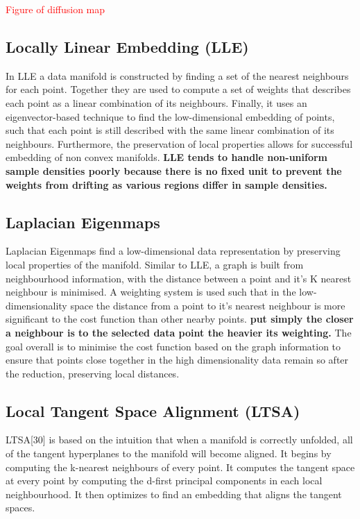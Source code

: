 \textcolor{red}{Figure of diffusion map}


\subsection{Locally Linear Embedding (LLE)}
In LLE a data manifold is constructed by finding a set of the nearest neighbours for each point. Together they are used to compute a set of weights that describes each point as a linear combination of its neighbours.
Finally, it uses an eigenvector-based technique to find the low-dimensional embedding of points, such that each point is still described with the same linear combination of its neighbours. Furthermore, the preservation of local properties allows for successful embedding of non convex manifolds.
{\bf LLE tends to handle non-uniform sample densities poorly because there is no fixed unit to prevent the weights from drifting as various regions differ in sample densities.}




\subsection{Laplacian Eigenmaps}\cite{Belkin2003}
Laplacian Eigenmaps find a low-dimensional data representation by preserving local properties of the
manifold. Similar to LLE, a graph is built from neighbourhood information, with the distance between a point and it's K nearest neighbour is minimised. A weighting system is used such that in the low-dimensionality space the distance from a point to it's nearest neighbour is more significant to the cost function than other nearby points. {\bf put simply the closer a neighbour is to the selected data point the heavier its weighting.} The goal overall is to minimise the cost function based on the graph information to ensure that points close together in the high dimensionality data remain so after the reduction, preserving local distances. 



\subsection{Local Tangent Space Alignment (LTSA)}
LTSA[30] is based on the intuition that when a manifold is correctly unfolded, all of the tangent hyperplanes to the manifold will become aligned. It begins by computing the k-nearest neighbours of every point. It computes the tangent space at every point by computing the d-first principal components in each local neighbourhood. It then optimizes to find an embedding that aligns the tangent spaces.

